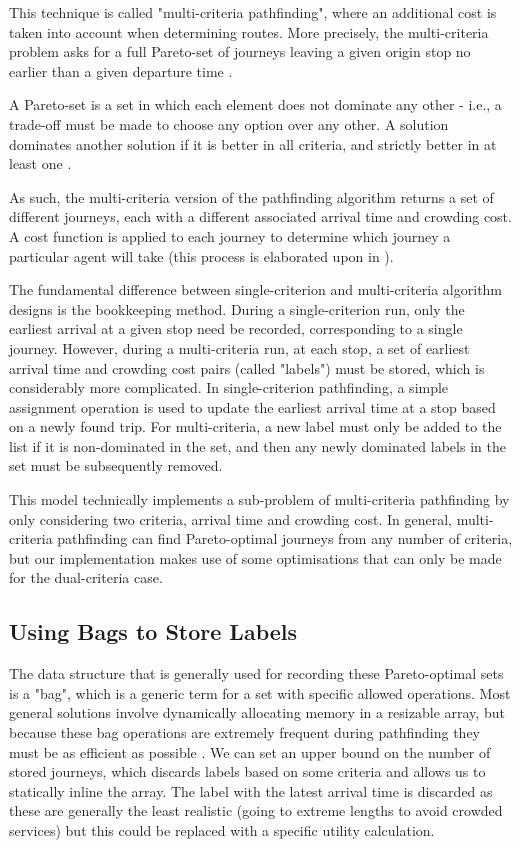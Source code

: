 This technique is called "multi-criteria pathfinding", where an additional cost is taken into account when determining routes. More precisely, the multi-criteria problem asks for a full Pareto-set of journeys leaving a given origin stop no earlier than a given departure time \cite{dellingRoundBasedPublicTransit2012}. 

A Pareto-set is a set in which each element does not dominate any other - i.e., a trade-off must be made to choose any option over any other. A solution dominates another solution if it is better in all criteria, and strictly better in at least one \cite{bergerAcceleratingTimeDependentMultiCriteria2009}.

As such, the multi-criteria version of the pathfinding algorithm returns a set of different journeys, each with a different associated arrival time and crowding cost. A cost function is applied to each journey to determine which journey a particular agent will take (this process is elaborated upon in ).

The fundamental difference between single-criterion and multi-criteria algorithm designs is the bookkeeping method. During a single-criterion run, only the earliest arrival at a given stop need be recorded, corresponding to a single journey. However, during a multi-criteria run, at each stop, a set of earliest arrival time and crowding cost pairs (called "labels") must be stored, which is considerably more complicated. In single-criterion pathfinding, a simple assignment operation is used to update the earliest arrival time at a stop based on a newly found trip. For multi-criteria, a new label must only be added to the list if it is non-dominated in the set, and then any newly dominated labels in the set must be subsequently removed.

This model technically implements a sub-problem of multi-criteria pathfinding by only considering two criteria, arrival time and crowding cost. In general, multi-criteria pathfinding can find Pareto-optimal journeys from any number of criteria, but our implementation makes use of some optimisations that can only be made for the dual-criteria case.

\subsection{Using Bags to Store Labels}
The data structure that is generally used for recording these Pareto-optimal sets is a "bag", which is a generic term for a set with specific allowed operations. Most general solutions involve dynamically allocating memory in a resizable array, but because these bag operations are extremely frequent during pathfinding they must be as efficient as possible \cite{dellingRoundBasedPublicTransit2012}. We can set an upper bound on the number of stored journeys, which discards labels based on some criteria and allows us to statically inline the array. The label with the latest arrival time is discarded as these are generally the least realistic (going to extreme lengths to avoid crowded services) but this could be replaced with a specific utility calculation.

